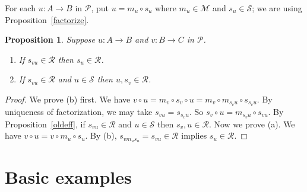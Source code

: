\documentclass[a4paper,12pt,reqno]{amsart}
\newtheorem{proposition}[theorem]{Proposition}
\theoremstyle{definition}
\theoremstyle{fact}
\theoremstyle{genquest}
\theoremstyle{step}
\newcommand{\dd}{\colon}
\newcommand{\ra}{\rightarrow}
\def\CM{{\mathscr M}}
\def\CP{{\mathscr P}}
\def\CR{{\mathscr R}}
\def\CS{{\mathscr S}}
\begin{document}
For each $u\dd A\ra B$ in $\CP$, put $u=m_u\circ s_u$ where $m_u\in \CM$
and $s_u\in \CS$; we are using Proposition~\ref{factorize}.

\begin{proposition}\label{esssub}
Suppose $u\dd A\ra B$ and $v\dd B\ra C$ in $\CP$. 
\begin{enumerate}
\item[(a)] If $s_{vu}\in \CR$ then $s_u\in \CR$. 
\item[(b)] If $s_{vu}\in \CR$ and $u\in \CS$ then $u, s_v\in \CR$.
\end{enumerate}
\end{proposition}
\begin{proof}
We prove (b) first. We have $v\circ u = m_v\circ s_v \circ u = m_v \circ m_{s_vu} \circ s_{s_vu}$. By uniqueness of factorization, we may take $s_{vu}= s_{s_vu}$.
So $s_v\circ u = m_{s_vu} \circ s_{vu}$. By Proposition~\ref{oldeff}, if $s_{vu}\in \CR$ and $u\in \CS$ then $s_v, u\in \CR$. 
Now we prove (a). We have $v\circ u = v \circ m_u\circ s_u$.
By (b), $s_{vm_us_u} = s_{vu} \in \CR$ implies $s_u\in \CR$.  \end{proof}

\section{Basic examples}\label{basex}
\end{document}
